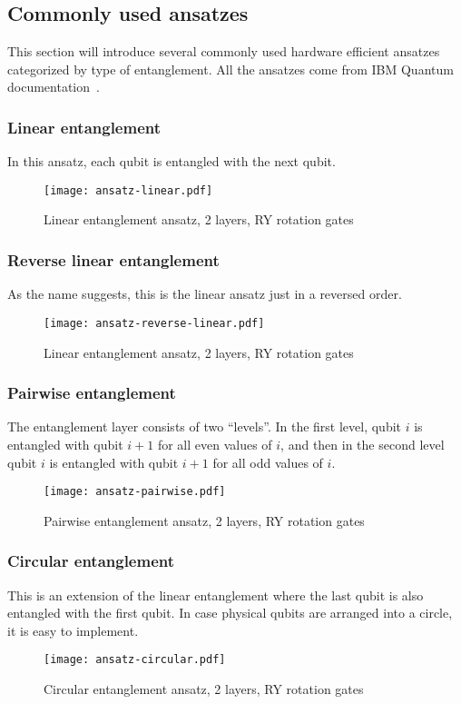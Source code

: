 \subsection{Commonly used ansatzes}\label{sec:ansatzes}
This section will introduce several commonly used hardware efficient ansatzes categorized by type of entanglement. All the ansatzes come from IBM Quantum documentation~\cite{twolocal}. 

\subsubsection{Linear entanglement}
In this ansatz, each qubit is entangled with the next qubit. 
\begin{figure}[H]
    \centering
    \texttt{[image: ansatz-linear.pdf]}
    \caption{Linear entanglement ansatz, 2 layers, RY rotation gates}
\end{figure}

\subsubsection{Reverse linear entanglement}
As the name suggests, this is the linear ansatz just in a reversed order.
\begin{figure}[H]
    \centering
    \texttt{[image: ansatz-reverse-linear.pdf]}
    \caption{Linear entanglement ansatz, 2 layers, RY rotation gates}
\end{figure}

\subsubsection{Pairwise entanglement}
The entanglement layer consists of two ``levels''. In the first level, qubit $i$ is entangled with qubit $i+1$ for all even values of $i$, and then in the second level qubit $i$ is entangled with qubit $i+1$ for all odd values of $i$. 
\begin{figure}[H]
    \centering
    \texttt{[image: ansatz-pairwise.pdf]}
    \caption{Pairwise entanglement ansatz, 2 layers, RY rotation gates}
\end{figure}

\subsubsection{Circular entanglement}
This is an extension of the linear entanglement where the last qubit is also entangled with the first qubit. In case physical qubits are arranged into a circle, it is easy to implement.
\begin{figure}[H]
    \centering
    \texttt{[image: ansatz-circular.pdf]}
    \caption{Circular entanglement ansatz, 2 layers, RY rotation gates}
\end{figure}

